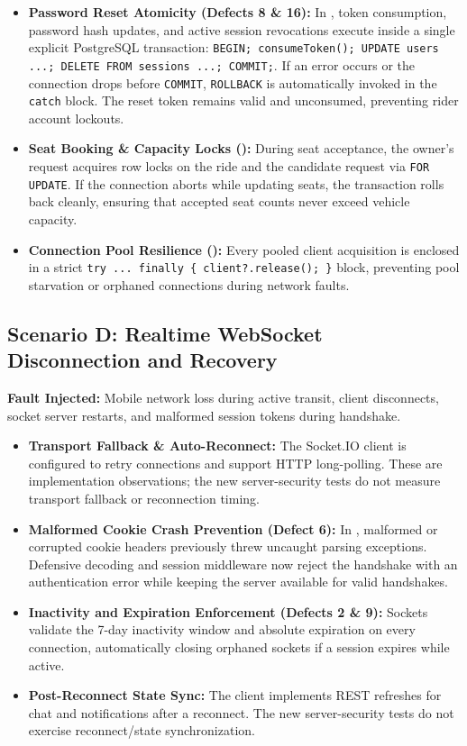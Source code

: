 \documentclass[10pt]{article}
\begin{document}
\begin{itemize}
  \item \textbf{Password Reset Atomicity (Defects 8 \& 16):} In , token consumption, password hash updates, and active session revocations execute inside a single explicit PostgreSQL transaction:
  \texttt{BEGIN; consumeToken(); UPDATE users ...; DELETE FROM sessions ...; COMMIT;}.
  If an error occurs or the connection drops before \texttt{COMMIT}, \texttt{ROLLBACK} is automatically invoked in the \texttt{catch} block. The reset token remains valid and unconsumed, preventing rider account lockouts.
  \item \textbf{Seat Booking \& Capacity Locks ():} During seat acceptance, the owner's request acquires row locks on the ride and the candidate request via \texttt{FOR UPDATE}. If the connection aborts while updating seats, the transaction rolls back cleanly, ensuring that accepted seat counts never exceed vehicle capacity.
  \item \textbf{Connection Pool Resilience ():} Every pooled client acquisition is enclosed in a strict \texttt{try ... finally \{ client?.release(); \}} block, preventing pool starvation or orphaned connections during network faults.
\end{itemize}

\subsection{Scenario D: Realtime WebSocket Disconnection and Recovery}
\textbf{Fault Injected:} Mobile network loss during active transit, client disconnects, socket server restarts, and malformed session tokens during handshake.

\begin{itemize}
  \item \textbf{Transport Fallback \& Auto-Reconnect:} The Socket.IO client is configured to retry connections and support HTTP long-polling. These are implementation observations; the new server-security tests do not measure transport fallback or reconnection timing.
  \item \textbf{Malformed Cookie Crash Prevention (Defect 6):} In , malformed or corrupted cookie headers previously threw uncaught parsing exceptions. Defensive decoding and session middleware now reject the handshake with an authentication error while keeping the server available for valid handshakes.
  \item \textbf{Inactivity and Expiration Enforcement (Defects 2 \& 9):} Sockets validate the 7-day inactivity window and absolute expiration on every connection, automatically closing orphaned sockets if a session expires while active.
  \item \textbf{Post-Reconnect State Sync:} The client implements REST refreshes for chat and notifications after a reconnect. The new server-security tests do not exercise reconnect/state synchronization.
\end{itemize}
\end{document}
